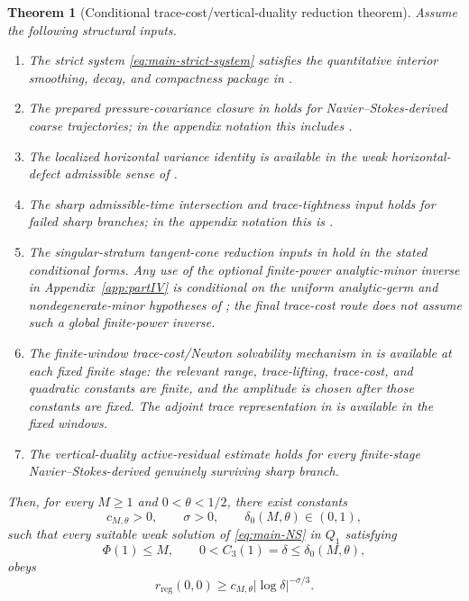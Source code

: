 \documentclass[11pt]{article}
\numberwithin{equation}{section}
\theoremstyle{plain}
\newtheorem{theorem}{Theorem}[section]
\theoremstyle{definition}
\theoremstyle{remark}
\newcommand{\reg}{\mathrm{reg}}
\begin{document}
\begin{theorem}[Conditional trace-cost/vertical-duality reduction theorem]\label{thm:main-final}
Assume the following structural inputs.
\begin{enumerate}[label=(\roman*)]
\item The strict system \eqref{eq:main-strict-system} satisfies the quantitative interior smoothing, decay, and compactness package in .
\item The prepared pressure-covariance closure in  holds for Navier--Stokes-derived coarse trajectories; in the appendix notation this includes .
\item The localized horizontal variance identity is available in the weak horizontal-defect admissible sense of .
\item The sharp admissible-time intersection and trace-tightness input  holds for failed sharp branches; in the appendix notation this is .
\item The singular-stratum tangent-cone reduction inputs in  hold in the stated conditional forms.  Any use of the optional finite-power analytic-minor inverse in Appendix~\ref{app:partIV} is conditional on the uniform analytic-germ and nondegenerate-minor hypotheses of ; the final trace-cost route does not assume such a global finite-power inverse.
\item The finite-window trace-cost/Newton solvability mechanism in  is available at each fixed finite stage: the relevant range, trace-lifting, trace-cost, and quadratic constants are finite, and the amplitude is chosen after those constants are fixed.  The adjoint trace representation in  is available in the fixed windows.
\item The vertical-duality active-residual estimate  holds for every finite-stage Navier--Stokes-derived genuinely surviving sharp branch.
\end{enumerate}
Then, for every \(M\ge1\) and \(0<\theta<1/2\), there exist constants
\[
        c_{M,\theta}>0,
        \qquad \sigma>0,
        \qquad \delta_0(M,\theta)\in(0,1),
\]
such that every suitable weak solution of \eqref{eq:main-NS} in \(Q_1\) satisfying
\[
        \Phi(1)\le M,
        \qquad 0<C_3(1)=\delta\le\delta_0(M,\theta),
\]
obeys
\begin{equation}\label{eq:main-final-radius}
        r_{\reg}(0,0)\ge c_{M,\theta}|\log\delta|^{-\sigma/3}.
\end{equation}
\end{theorem}
\end{document}
